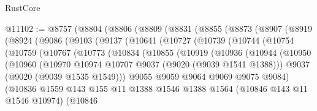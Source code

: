 \begin{lexlean}{RustCore}
\begin{coremodule}
@11102 := @8757
    (@8804
      (@8806
        (@8809
          (@8831
            (@8855
              (@8873
                (@8907
                  (@8919
                    (@8924
                      (@9086
                        (@9103
                          (@9137
                            (@10641
                              (@10727
                                (@10739
                                  (@10744
                                    (@10754
                                      (@10759
                                        (@10767
                                          (@10773
                                            (@10834
                                              (@10855
                                                (@10919
                                                  (@10936
                                                    (@10944
                                                      (@10950
                                                        (@10960
                                                          (@10970
                                                            @10974
                                                            @10707
                                                            @9037
                                                            (@9020 (@9039 @1541 @1388)))
                                                          @9037
                                                          (@9020 (@9039 @1535 @1549)))
                                                        @9055
                                                        @9059
                                                        @9064
                                                        @9069
                                                        @9075
                                                        @9084)
                                                      (@10836
                                                        @1559
                                                        @143
                                                        @155
                                                        @11
                                                        @1388
                                                        @1546
                                                        @1388
                                                        @1564
                                                        (@10846 @143 @11 @1546 @10974)
                                                        (@10846

\end{coremodule}
\end{lexlean}
